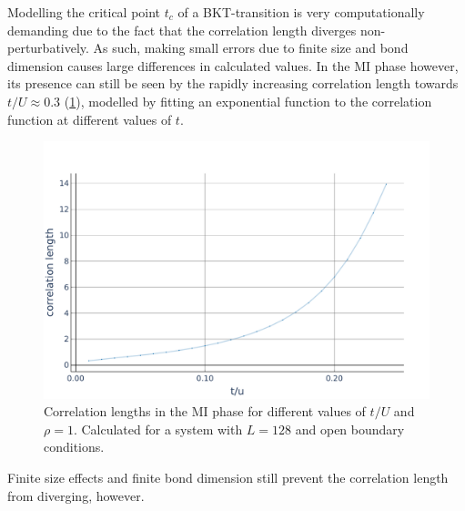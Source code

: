 \documentclass[twoside,twocolumn,9pt]{article}
\begin{document}
Modelling the critical point $t_c$ of a BKT-transition is very computationally demanding due to the fact that the correlation length diverges non-perturbatively. As such, making small errors due to finite size and bond dimension causes large differences in calculated values. In the MI phase however, its presence can still be seen by the rapidly increasing correlation length towards $t/U\approx 0.3$ (\cref{fig:cor lengths}), modelled by fitting an exponential function to the correlation function at different values of $t$. 
\begin{center}
  \begin{figure}
      \includegraphics[width=\linewidth]{../code/figures/Correlations-length-values.pdf}
      \caption{Correlation lengths in the MI phase for different values of $t/U$ and $\rho=1$. Calculated for a system with $L=128$ and open boundary conditions.}
      \label{fig:cor lengths}
  \end{figure}
\end{center}
Finite size effects and finite bond dimension still prevent the correlation length from diverging, however. 
\end{document}
